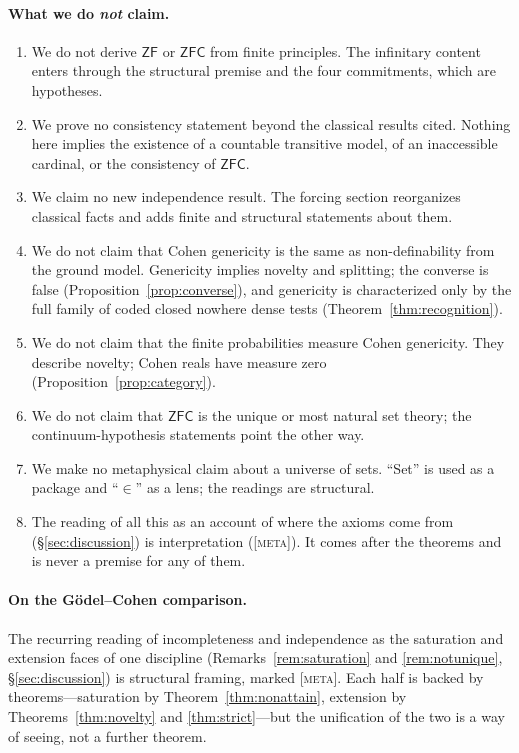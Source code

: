 \documentclass[11pt]{article}
\newcommand{\gradetag}[1]{\textnormal{\textsc{[#1]}}}
\newcommand{\metag}{\gradetag{meta}}
\theoremstyle{definition}
\begin{document}
\paragraph{What we do \emph{not} claim.}
\begin{enumerate}\itemsep1pt
  \item We do not derive $\mathsf{ZF}$ or $\mathsf{ZFC}$ from finite principles. The infinitary
  content enters through the structural premise and the four commitments, which are hypotheses.
  \item We prove no consistency statement beyond the classical results cited. Nothing here
  implies the existence of a countable transitive model, of an inaccessible cardinal, or the
  consistency of $\mathsf{ZFC}$.
  \item We claim no new independence result. The forcing section reorganizes classical facts and
  adds finite and structural statements about them.
  \item We do not claim that Cohen genericity is the same as non-definability from the ground
  model. Genericity implies novelty and splitting; the converse is false
  (Proposition~\ref{prop:converse}), and genericity is characterized only by the full family of
  coded closed nowhere dense tests (Theorem~\ref{thm:recognition}).
  \item We do not claim that the finite probabilities measure Cohen genericity. They describe
  novelty; Cohen reals have measure zero (Proposition~\ref{prop:category}).
  \item We do not claim that $\mathsf{ZFC}$ is the unique or most natural set theory; the
  continuum-hypothesis statements point the other way.
  \item We make no metaphysical claim about a universe of sets. ``Set'' is used as a package and
  ``$\in$'' as a lens; the readings are structural.
  \item The reading of all this as an account of where the axioms come from
  (\S\ref{sec:discussion}) is interpretation (\metag). It comes after the theorems and is never a
  premise for any of them.
\end{enumerate}

\paragraph{On the G\"odel--Cohen comparison.} The recurring reading of incompleteness and
independence as the saturation and extension faces of one discipline
(Remarks~\ref{rem:saturation} and \ref{rem:notunique}, \S\ref{sec:discussion}) is structural
framing, marked \metag. Each half is backed by theorems---saturation by
Theorem~\ref{thm:nonattain}, extension by Theorems~\ref{thm:novelty} and \ref{thm:strict}---but
the unification of the two is a way of seeing, not a further theorem.
\end{document}
